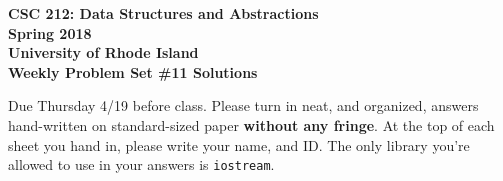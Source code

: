 \documentclass[11pt]{article}
\begin{document}
\thispagestyle{empty}

\begin{center}
    {\Large\bf CSC 212: Data Structures and Abstractions}\\
    \medskip
    {\Large\bf Spring 2018}\\
    \medskip
    {\Large\bf University of Rhode Island}\\
    \bigskip
    {\Large\bf Weekly Problem Set \#11 Solutions}
\end{center}

Due Thursday 4/19 before class. Please turn in neat, and organized, answers hand-written on standard-sized paper \textbf{without any fringe}. At the top of each sheet you hand in, please write your name, and ID.
The only library you're allowed to use in your answers is \verb|iostream|.
\end{document}
